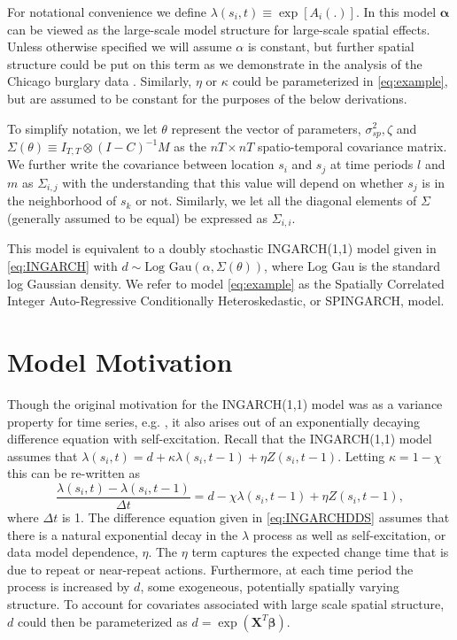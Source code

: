 \documentclass[11pt]{isuthesis}
\begin{document}
For notational convenience we define $\lambda(s_i,t)\equiv\exp \left[ A_i(.) \right]$. In this model $\boldsymbol{\alpha}$ can be viewed as the large-scale model structure for large-scale spatial effects.  Unless otherwise specified we will assume $\alpha$ is constant, but further spatial structure could be put on this term as we demonstrate in the analysis of the Chicago burglary data .  Similarly, $\eta$ or $\kappa$ could be parameterized in \eqref{eq:example}, but are assumed to be constant for the purposes of the below derivations.

To simplify notation, we let $\theta$ represent the vector of parameters, $\sigma_{sp}^2,\zeta$ and $\Sigma(\theta) \equiv I_{T,T}\otimes(I-C)^{-1}M$ as the $nT \times nT$ spatio-temporal covariance matrix.  We further write the covariance between location $s_i$ and $s_j$ at time periods $l$ and $m$ as $\Sigma_{i,j}$ with the understanding that this value will depend on whether $s_j$ is in the neighborhood of $s_k$ or not.  Similarly, we let all the diagonal elements of $\Sigma$ (generally assumed to be equal) be expressed as $\Sigma_{i,i}$. 

This model is equivalent to a doubly stochastic INGARCH(1,1) model given in \eqref{eq:INGARCH} with $d\sim \mbox{Log Gau}(\alpha,\Sigma(\theta))$, where Log Gau is the standard log Gaussian density.  We refer to model \eqref{eq:example} as the Spatially Correlated Integer Auto-Regressive Conditionally Heteroskedastic, or SPINGARCH, model.  


\section{Model Motivation}

Though the original motivation for the INGARCH(1,1) model was as a variance property for time series, e.g. \cite{ferland2006integer}, it also arises out of an exponentially decaying difference equation with self-excitation.  Recall that the INGARCH(1,1) model assumes that $\lambda(s_i,t)=d+\kappa \lambda(s_i,t-1)+\eta Z(s_i,t-1)$.  Letting $\kappa=1-\chi$ this can be re-written as
\begin{equation}
	\frac{\lambda(s_i,t)-\lambda(s_i,t-1)}{\Delta t}=d-\chi \lambda(s_i,t-1)+\eta Z(s_i,t-1), \label{eq:INGARCHDDS}
\end{equation}
where $\Delta t$ is 1.  The difference equation given in \eqref{eq:INGARCHDDS} assumes that there is a natural exponential decay in the $\lambda$ process as well as self-excitation, or data model dependence, $\eta$.  The $\eta$ term captures the expected change time that is due to repeat or near-repeat actions.  Furthermore, at each time period the process is increased by $d$, some exogeneous, potentially spatially varying structure.  To account for covariates associated with large scale spatial structure, $d$ could then be parameterized as $d=\exp(\boldsymbol{X}^T \boldsymbol{\beta})$.
\end{document}
